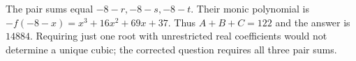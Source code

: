 The pair sums equal $-8-r,-8-s,-8-t$. Their monic polynomial is $-f(-8-x)=x^3+16x^2+69x+37$. Thus $A+B+C=122$ and the answer is $\boxed{14884}$. Requiring just one root with unrestricted real coefficients would not determine a unique cubic; the corrected question requires all three pair sums.
